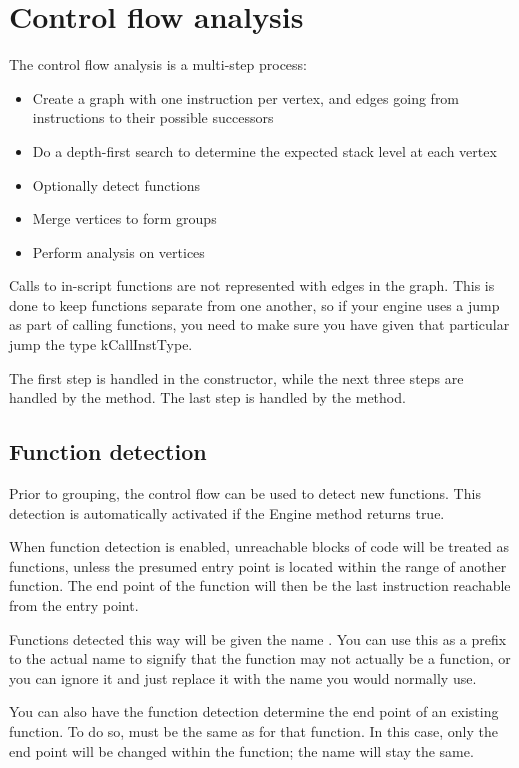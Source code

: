\section{Control flow analysis}

The control flow analysis is a multi-step process:

\begin{itemize}
\item Create a graph with one instruction per vertex, and edges going from instructions to their possible successors
\item Do a depth-first search to determine the expected stack level at each vertex
\item Optionally detect functions
\item Merge vertices to form groups
\item Perform analysis on vertices
\end{itemize}

Calls to in-script functions are not represented with edges in the graph. This is done to keep functions separate from one another, so if your engine uses a jump as part of calling functions, you need to make sure you have given that particular jump the type kCallInstType.

The first step is handled in the constructor, while the next three steps are handled by the  method. The last step is handled by the  method.

\subsection{Function detection}
\label{sec:autofunc}
Prior to grouping, the control flow can be used to detect new functions. This detection is automatically activated if the Engine method  returns true.

When function detection is enabled, unreachable blocks of code will be treated as functions, unless the presumed entry point is located within the range of another function. The end point of the function will then be the last instruction reachable from the entry point.

Functions detected this way will be given the name . You can use this as a prefix to the actual name to signify that the function may not actually be a function, or you can ignore it and just replace it with the name you would normally use.

You can also have the function detection determine the end point of an existing function. To do so,  must be the same as  for that function. In this case, only the end point will be changed within the function; the name will stay the same.

